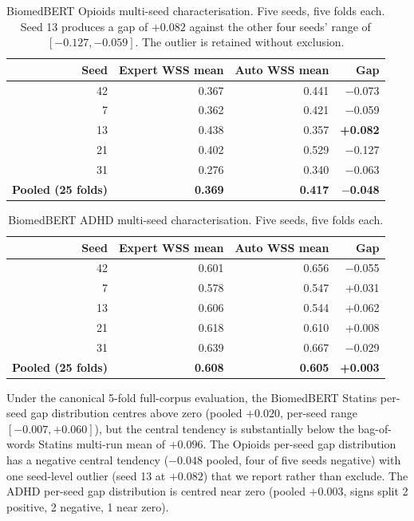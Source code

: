 \documentclass[11pt,a4paper]{article}
\begin{document}
\begin{table}[h]
\centering
\small
\begin{tabular}{rrrr}
\toprule
Seed & Expert WSS mean & Auto WSS mean & Gap \\
\midrule
42 & 0.367 & 0.441 & $-$0.073 \\
7  & 0.362 & 0.421 & $-$0.059 \\
13 & 0.438 & 0.357 & \textbf{+0.082} \\
21 & 0.402 & 0.529 & $-$0.127 \\
31 & 0.276 & 0.340 & $-$0.063 \\
\midrule
\textbf{Pooled (25 folds)} & \textbf{0.369} & \textbf{0.417} & \textbf{$-$0.048} \\
\bottomrule
\end{tabular}
\caption{BiomedBERT Opioids multi-seed characterisation. Five seeds, five folds each. Seed 13 produces a gap of $+0.082$ against the other four seeds' range of $[-0.127, -0.059]$. The outlier is retained without exclusion.}
\label{tab:bert_opiods}
\end{table}

\begin{table}[h]
\centering
\small
\begin{tabular}{rrrr}
\toprule
Seed & Expert WSS mean & Auto WSS mean & Gap \\
\midrule
42 & 0.601 & 0.656 & $-$0.055 \\
7  & 0.578 & 0.547 & +0.031 \\
13 & 0.606 & 0.544 & +0.062 \\
21 & 0.618 & 0.610 & +0.008 \\
31 & 0.639 & 0.667 & $-$0.029 \\
\midrule
\textbf{Pooled (25 folds)} & \textbf{0.608} & \textbf{0.605} & \textbf{+0.003} \\
\bottomrule
\end{tabular}
\caption{BiomedBERT ADHD multi-seed characterisation. Five seeds, five folds each.}
\label{tab:bert_adhd}
\end{table}

Under the canonical 5-fold full-corpus evaluation, the BiomedBERT Statins per-seed gap distribution centres above zero (pooled $+0.020$, per-seed range $[-0.007, +0.060]$), but the central tendency is substantially below the bag-of-words Statins multi-run mean of $+0.096$. The Opioids per-seed gap distribution has a negative central tendency ($-0.048$ pooled, four of five seeds negative) with one seed-level outlier (seed 13 at $+0.082$) that we report rather than exclude. The ADHD per-seed gap distribution is centred near zero (pooled $+0.003$, signs split 2 positive, 2 negative, 1 near zero).
\end{document}
